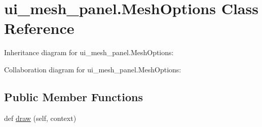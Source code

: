 \hypertarget{classui__mesh__panel_1_1MeshOptions}{}\section{ui\+\_\+mesh\+\_\+panel.\+Mesh\+Options Class Reference}
\label{classui__mesh__panel_1_1MeshOptions}


 




Inheritance diagram for ui\+\_\+mesh\+\_\+panel.\+Mesh\+Options\+:


Collaboration diagram for ui\+\_\+mesh\+\_\+panel.\+Mesh\+Options\+:
\subsection*{Public Member Functions}
\begin{DoxyCompactItemize}
\item 
def \hyperlink{classui__mesh__panel_1_1MeshOptions_a3451cf653fb618e0be76afa706b6d3aa}{draw} (self, context)
\end{DoxyCompactItemize}
